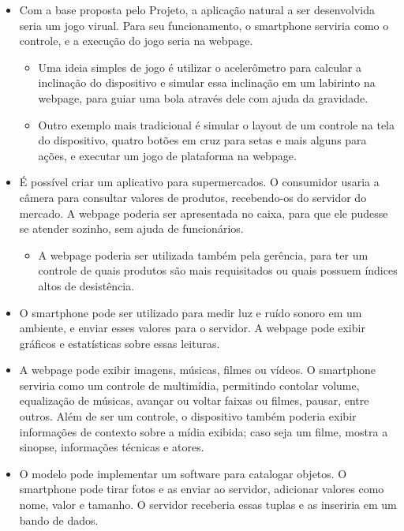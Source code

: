 \documentclass[a4paper,12pt]{article}
\begin{document}
\begin{itemize}
    \item Com a base proposta pelo Projeto, a aplicação natural a ser desenvolvida seria um jogo virual. Para seu funcionamento, o smartphone serviria como o controle, e a execução do jogo seria na webpage.

    \begin{itemize}
        \item Uma ideia simples de jogo é utilizar o acelerômetro para calcular a inclinação do dispositivo e simular essa inclinação em um labirinto na webpage, para guiar uma bola através dele com ajuda da gravidade.

        \item Outro exemplo mais tradicional é simular o layout de um controle na tela do dispositivo, quatro botões em cruz para setas e mais alguns para ações, e executar um jogo de plataforma na webpage.
    \end{itemize}

    \item É possível criar um aplicativo para supermercados. O consumidor usaria a câmera para consultar valores de produtos, recebendo-os do servidor do mercado. A webpage poderia ser apresentada no caixa, para que ele pudesse se atender sozinho, sem ajuda de funcionários.

    \begin{itemize}
        \item A webpage poderia ser utilizada também pela gerência, para ter um controle de quais produtos são mais requisitados ou quais possuem índices altos de desistência.
    \end{itemize}

    \item O smartphone pode ser utilizado para medir luz e ruído sonoro em um ambiente, e enviar esses valores para o servidor. A webpage pode exibir gráficos e estatísticas sobre essas leituras.

    \item A webpage pode exibir imagens, músicas, filmes ou vídeos. O smartphone serviria como um controle de multimídia, permitindo contolar volume, equalização de músicas, avançar ou voltar faixas ou filmes, pausar, entre outros. Além de ser um controle, o dispositivo também poderia exibir informações de contexto sobre a mídia exibida; caso seja um filme, mostra a sinopse, informações técnicas e atores.

    \item O modelo pode implementar um software para catalogar objetos. O smartphone pode tirar fotos e as enviar ao servidor, adicionar valores como nome, valor e tamanho. O servidor receberia essas tuplas e as inseriria em um bando de dados.

\end{itemize}
\end{document}
